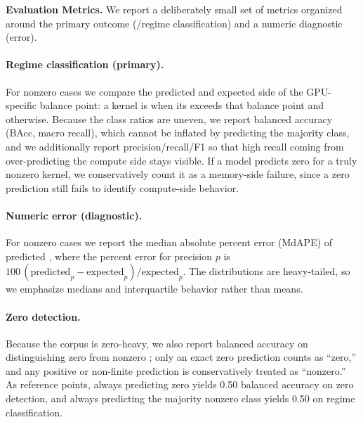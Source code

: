 \noindent\textbf{Evaluation Metrics.}
We report a deliberately small set of metrics organized around the primary outcome (\bandwidthbound/\computebound regime classification) and a numeric diagnostic (\rai error).

\paragraph{Regime classification (primary).}
For nonzero cases we compare the predicted and expected side of the GPU-specific balance point: a kernel is \computebound when its \rai exceeds that balance point and \bandwidthbound otherwise.
Because the class ratios are uneven, we report balanced accuracy (BAcc, macro recall), which cannot be inflated by predicting the majority class, and we additionally report \computebound precision/recall/F1 so that high recall coming from over-predicting the compute side stays visible.
If a model predicts zero for a truly nonzero kernel, we conservatively count it as a memory-side failure, since a zero prediction still fails to identify compute-side behavior.

\paragraph{Numeric \rai error (diagnostic).}
For nonzero cases we report the median absolute percent error (MdAPE) of predicted \rai, where the percent error for precision $p$ is $100\,(\text{predicted}_p - \text{expected}_p)/\text{expected}_p$.
The distributions are heavy-tailed, so we emphasize medians and interquartile behavior rather than means.

\paragraph{Zero detection.}
Because the corpus is zero-heavy, we also report balanced accuracy on distinguishing zero from nonzero \rai; only an exact zero prediction counts as ``zero,'' and any positive or non-finite prediction is conservatively treated as ``nonzero.''
As reference points, always predicting zero yields 0.50 balanced accuracy on zero detection, and always predicting the majority nonzero class yields 0.50 on regime classification.











